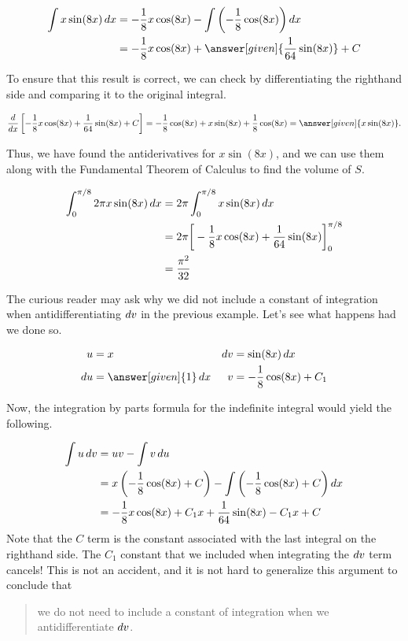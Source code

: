 \documentclass[noauthor]{ximera}
\begin{document}
\begin{model}
\begin{align*}
\int x\sin(8x) \d x &=-\frac{1}{8}x\cos(8x) -\int \left(-\frac{1}{8}\cos(8x)\right) \d x \\
&=-\frac{1}{8}x\cos(8x) + \answer[given]{\frac{1}{64}\sin(8x)} +C 
\end{align*}

To ensure that this result is correct, we can check by differentiating the righthand side and comparing it to the original integral.

\[
\ddx\left[-\frac{1}{8}x\cos(8x) +\frac{1}{64}\sin(8x) +C \right] = -\frac{1}{8} \cos(8x) +x \sin(8x) +\frac{1}{8} \cos(8x) = \answer[given]{x \sin(8x)}.
\]

Thus, we have found the antiderivatives for $x\sin(8x)$, and we can use them along with the Fundamental Theorem of Calculus to find the volume of $S$.

\begin{align*}
\int_{0}^{\pi/8} 2 \pi x\sin(8x) \mathop{}\!d x &= 2 \pi \int_{0}^{\pi/8} x\sin(8x) \mathop{}\!d x \\
&= 2 \pi \bigg[  -\frac{1}{8}x\cos(8x) + \frac{1}{64}\sin(8x) \bigg]_0^{\pi/8}\\
&=\frac{\pi^{2}}{32}
\end{align*}

\begin{remark}
The curious reader may ask why we did not include a constant of integration when antidifferentiating $\mathop{}\!d v$ in the previous example.  Let's see what happens had we done so.

\begin{align*}
u &= x & \d v & = \sin(8x) \d x \\
 \d u &= \answer[given]{1} \d x & v&=-\frac{1}{8}\cos(8x) +C_1
\end{align*}

Now, the integration by parts formula for the indefinite integral would yield the following.

\begin{align*}
\int u \mathop{}\!d v &= uv -\int v \mathop{}\!d u \\
 &=x \left(-\frac{1}{8}\cos(8x)+C\right) -\int \left(-\frac{1}{8}\cos(8x)+C\right) \mathop{}\!d x \\
  &=-\frac{1}{8}x\cos(8x)+C_1x + \frac{1}{64}\sin(8x) -C_1x +C \\
\end{align*}
Note that the $C$ term is the constant associated with the last integral on the righthand side.  The $C_1$ constant that we included when integrating the $\mathop{}\!d v$ term cancels!  This is not an accident, and it is not hard to generalize this argument to conclude that

\begin{quote}
we do not need to include a constant of integration when we antidifferentiate $\mathop{}\!d v$.
\end{quote}
\end{remark}

\end{model}
\end{document}
